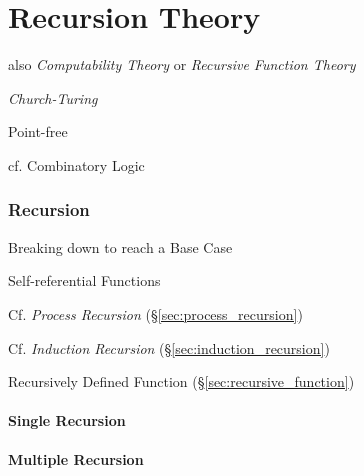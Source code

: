 \part{Recursion Theory}\label{part:recursion_theory}\cite{czoo14}

also \emph{Computability Theory} or \emph{Recursive Function Theory}

\emph{Church-Turing}

Point-free

\fist cf. Combinatory Logic



\section{Recursion}\label{sec:recursion}

Breaking down to reach a Base Case

Self-referential Functions

\fist Cf. \emph{Process Recursion} (\S\ref{sec:process_recursion})

\fist Cf. \emph{Induction Recursion} (\S\ref{sec:induction_recursion})

\fist Recursively Defined Function (\S\ref{sec:recursive_function})



\subsection{Single Recursion}\label{sec:single_recursion}

\subsection{Multiple Recursion}\label{sec:multiple_recursion}

